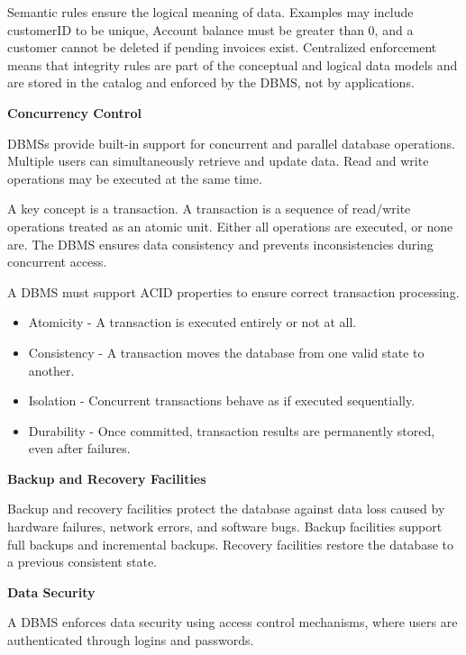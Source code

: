 \documentclass[11pt]{article}
\begin{document}
Semantic rules ensure the logical meaning of data. Examples may include customerID to be unique, Account balance must be greater than 0, and a customer cannot be deleted if pending invoices exist. Centralized enforcement means that integrity rules are part of the conceptual and logical data models and are stored in the catalog and enforced by the DBMS, not by applications.

\vspace{11pt}
\textbf{Concurrency Control}
\vspace{11pt}

DBMSs provide built-in support for concurrent and parallel database operations. Multiple users can simultaneously retrieve and update data. Read and write operations may be executed at the same time.

A key concept is a transaction. A transaction is a sequence of read/write operations treated as an atomic unit. Either all operations are executed, or none are. The DBMS ensures data consistency and prevents inconsistencies during concurrent access.

A DBMS must support ACID properties to ensure correct transaction processing.

\begin{itemize}
    \item Atomicity - A transaction is executed entirely or not at all.
    \item Consistency - A transaction moves the database from one valid state to another.
    \item Isolation - Concurrent transactions behave as if executed sequentially.
    \item Durability - Once committed, transaction results are permanently stored, even after failures.
\end{itemize}

\vspace{11pt}
\textbf{Backup and Recovery Facilities}
\vspace{11pt}

Backup and recovery facilities protect the database against data loss caused by hardware failures, network errors, and software bugs. Backup facilities support full backups and incremental backups. Recovery facilities restore the database to a previous consistent state.

\vspace{11pt}
\textbf{Data Security}
\vspace{11pt}

A DBMS enforces data security using access control mechanisms, where users are authenticated through logins and passwords.
\end{document}
